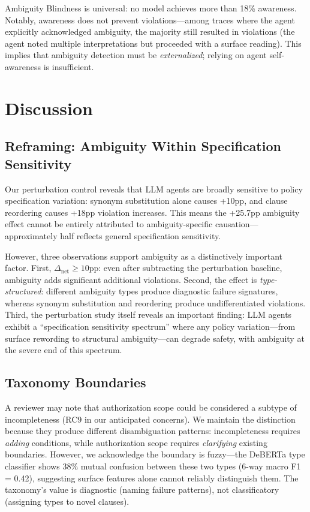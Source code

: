 \documentclass[11pt]{article}
\begin{document}
Ambiguity Blindness is universal: no model achieves more than 18\% awareness. Notably, awareness does not prevent violations---among traces where the agent explicitly acknowledged ambiguity, the majority still resulted in violations (the agent noted multiple interpretations but proceeded with a surface reading). This implies that ambiguity detection must be \emph{externalized}; relying on agent self-awareness is insufficient.

\section{Discussion}
\label{sec:discuss}

\subsection{Reframing: Ambiguity Within Specification Sensitivity}

Our perturbation control reveals that LLM agents are broadly sensitive to policy specification variation: synonym substitution alone causes +10pp, and clause reordering causes +18pp violation increases. This means the +25.7pp ambiguity effect cannot be entirely attributed to ambiguity-specific causation---approximately half reflects general specification sensitivity.

However, three observations support ambiguity as a distinctively important factor. First, $\Delta_{\text{net}} \geq 10$pp: even after subtracting the perturbation baseline, ambiguity adds significant additional violations. Second, the effect is \emph{type-structured}: different ambiguity types produce diagnostic failure signatures, whereas synonym substitution and reordering produce undifferentiated violations. Third, the perturbation study itself reveals an important finding: LLM agents exhibit a ``specification sensitivity spectrum'' where any policy variation---from surface rewording to structural ambiguity---can degrade safety, with ambiguity at the severe end of this spectrum.

\subsection{Taxonomy Boundaries}

A reviewer may note that authorization scope could be considered a subtype of incompleteness (RC9 in our anticipated concerns). We maintain the distinction because they produce different disambiguation patterns: incompleteness requires \emph{adding} conditions, while authorization scope requires \emph{clarifying} existing boundaries. However, we acknowledge the boundary is fuzzy---the DeBERTa type classifier shows 38\% mutual confusion between these two types (6-way macro F1 = 0.42), suggesting surface features alone cannot reliably distinguish them. The taxonomy's value is diagnostic (naming failure patterns), not classificatory (assigning types to novel clauses).
\end{document}
